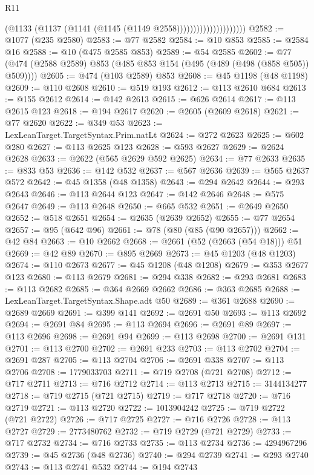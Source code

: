 \begin{lexlean}{R11}
\begin{coremodule}
                                    (@1133 (@1137 (@1141 (@1145 (@1149 @2558)))))))))))))))))))))
@2582 := @1077 (@235 @2580)
@2583 := @77 @2582
@2584 := @10 @853
@2585 := @2584 @16
@2588 := @10 (@475 @2585 @853)
@2589 := @54 @2585
@2602 := @77 (@474 (@2588 @2589) @853 (@485 @853 @154 (@495 (@489 (@498 (@858 @505)) @509))))
@2605 := @474 (@103 @2589) @853
@2608 := @45 @1198 (@48 @1198)
@2609 := @110 @2608
@2610 := @519 @193
@2612 := @113 @2610 @684
@2613 := @155 @2612
@2614 := @142 @2613
@2615 := @626 @2614
@2617 := @113 @2615 @123
@2618 := @194 @2617
@2620 := @2605 (@2609 @2618)
@2621 := @77 @2620
@2622 := @349 @53
@2623 := LexLeanTarget.TargetSyntax.Prim.natLt
@2624 := @272 @2623
@2625 := @602 @280
@2627 := @113 @2625 @123
@2628 := @593 @2627
@2629 := @2624 @2628
@2633 := @2622 (@565 @2629 @592 @2625)
@2634 := @77 @2633
@2635 := @833 @53
@2636 := @142 @532
@2637 := @567 @2636
@2639 := @565 @2637 @572
@2642 := @45 @1358 (@48 @1358)
@2643 := @294 @2642
@2644 := @293 @2643
@2646 := @113 @2644 @123
@2647 := @142 @2646
@2648 := @575 @2647
@2649 := @113 @2648
@2650 := @665 @532
@2651 := @2649 @2650
@2652 := @518 @2651
@2654 := @2635 (@2639 @2652)
@2655 := @77 @2654
@2657 := @95 (@642 @96)
@2661 := @78 (@80 (@85 (@90 @2657)))
@2662 := @42 @84
@2663 := @10 @2662
@2668 := @2661 (@52 (@2663 (@54 @18))) @51
@2669 := @42 @89
@2670 := @895 @2669
@2673 := @45 @1203 (@48 @1203)
@2674 := @110 @2673
@2677 := @45 @1208 (@48 @1208)
@2679 := @353 @2677 @123
@2680 := @113 @2679
@2681 := @294 @338
@2682 := @293 @2681
@2683 := @113 @2682
@2685 := @364 @2669 @2662
@2686 := @363 @2685
@2688 := LexLeanTarget.TargetSyntax.Shape.adt @50
@2689 := @361 @2688
@2690 := @2689 @2669
@2691 := @399 @141
@2692 := @2691 @50
@2693 := @113 @2692
@2694 := @2691 @84
@2695 := @113 @2694
@2696 := @2691 @89
@2697 := @113 @2696
@2698 := @2691 @94
@2699 := @113 @2698
@2700 := @2691 @131
@2701 := @113 @2700
@2702 := @2691 @233
@2703 := @113 @2702
@2704 := @2691 @287
@2705 := @113 @2704
@2706 := @2691 @338
@2707 := @113 @2706
@2708 := 1779033703
@2711 := @719 @2708 (@721 @2708)
@2712 := @717 @2711
@2713 := @716 @2712
@2714 := @113 @2713
@2715 := 3144134277
@2718 := @719 @2715 (@721 @2715)
@2719 := @717 @2718
@2720 := @716 @2719
@2721 := @113 @2720
@2722 := 1013904242
@2725 := @719 @2722 (@721 @2722)
@2726 := @717 @2725
@2727 := @716 @2726
@2728 := @113 @2727
@2729 := 2773480762
@2732 := @719 @2729 (@721 @2729)
@2733 := @717 @2732
@2734 := @716 @2733
@2735 := @113 @2734
@2736 := 4294967296
@2739 := @45 @2736 (@48 @2736)
@2740 := @294 @2739
@2741 := @293 @2740
@2743 := @113 @2741 @532
@2744 := @194 @2743

\end{coremodule}
\end{lexlean}
